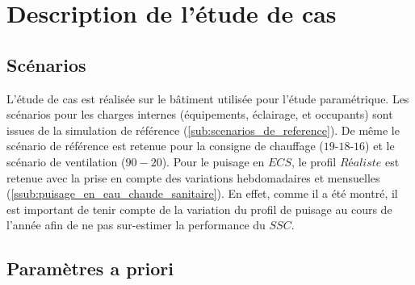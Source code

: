 




\section{Description de l’étude de cas} %
\label{sec:description_de_l_etude_de_cas}
\subsection{Scénarios} %
\label{sub:scenarios}
L’étude de cas est réalisée sur le bâtiment utilisée pour l’étude paramétrique.
Les scénarios pour les charges internes (équipements, éclairage, et occupants) sont
issues de la simulation de référence (\ref{sub:scenarios_de_reference}). De même
le scénario de référence est retenue pour la consigne de chauffage ($19$-$18$-$16$)
et le scénario de ventilation ($90-20$).
Pour le puisage en $ECS$, le profil $Réaliste$ est retenue avec la prise en compte des
variations hebdomadaires et mensuelles (\ref{ssub:puisage_en_eau_chaude_sanitaire}).
En effet, comme il a été montré, il est important de tenir compte de la variation
du profil de puisage au cours de l’année afin de ne pas sur-estimer la performance
du $SSC$.



\subsection{Paramètres a priori} %
\label{sub:parametres_a_priori}
~



